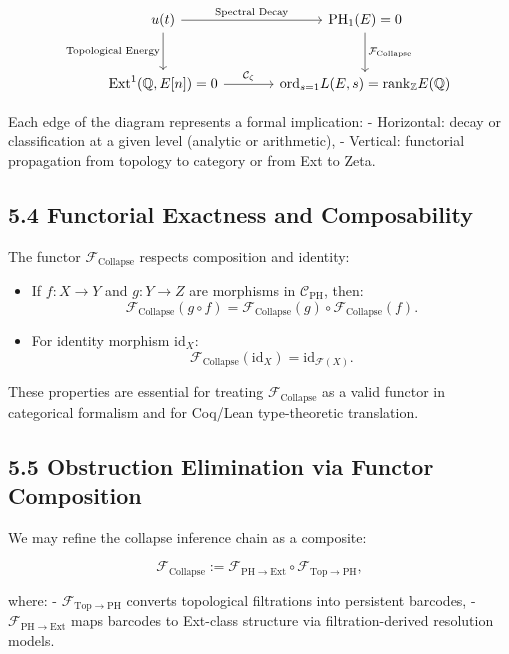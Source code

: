 \documentclass[11pt]{article}
\DeclareMathOperator{\Ext}{Ext}
\DeclareMathOperator{\PH}{PH}
\newcommand{\QQ}{\mathbb{Q}}
\newcommand{\ZZ}{\mathbb{Z}}
\begin{document}
\[
\begin{tikzcd}[row sep=large, column sep=large]
u(t) \arrow[r, "\text{Spectral Decay}"] \arrow[d, "\text{Topological Energy}"']
& \PH_1(E) = 0 \arrow[d, "\mathcal{F}_{\mathrm{Collapse}}"] \\
\Ext^1(\QQ,E[n]) = 0 \arrow[r, "\mathcal{C}_\zeta"]
& \mathrm{ord}_{s=1} L(E,s) = \mathrm{rank}_{\ZZ} E(\QQ)
\end{tikzcd}
\]


Each edge of the diagram represents a formal implication:
- Horizontal: decay or classification at a given level (analytic or arithmetic),
- Vertical: functorial propagation from topology to category or from Ext to Zeta.

\subsection{5.4 Functorial Exactness and Composability}

The functor $\mathcal{F}_{\mathrm{Collapse}}$ respects composition and identity:

\begin{itemize}
  \item If $f: X \to Y$ and $g: Y \to Z$ are morphisms in $\mathcal{C}_{\mathrm{PH}}$, then:
  \[
  \mathcal{F}_{\mathrm{Collapse}}(g \circ f) = \mathcal{F}_{\mathrm{Collapse}}(g) \circ \mathcal{F}_{\mathrm{Collapse}}(f).
  \]
  \item For identity morphism $\mathrm{id}_X$:
  \[
  \mathcal{F}_{\mathrm{Collapse}}(\mathrm{id}_X) = \mathrm{id}_{\mathcal{F}(X)}.
  \]
\end{itemize}

These properties are essential for treating $\mathcal{F}_{\mathrm{Collapse}}$ as a valid functor in categorical formalism and for Coq/Lean type-theoretic translation.

\subsection{5.5 Obstruction Elimination via Functor Composition}

We may refine the collapse inference chain as a composite:

\[
\mathcal{F}_{\mathrm{Collapse}} := \mathcal{F}_{\mathrm{PH} \to \mathrm{Ext}} \circ \mathcal{F}_{\mathrm{Top} \to \mathrm{PH}},
\]

where:
- $\mathcal{F}_{\mathrm{Top} \to \mathrm{PH}}$ converts topological filtrations into persistent barcodes,
- $\mathcal{F}_{\mathrm{PH} \to \mathrm{Ext}}$ maps barcodes to Ext-class structure via filtration-derived resolution models.
\end{document}
